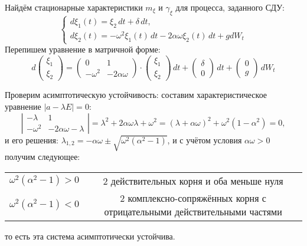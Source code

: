 \begin{ex}
  Найдём стационарные характеристики $m_\xi$ и $\gamma_\xi$ для процесса, заданного СДУ:
  \[
    \begin{cases}
      d\xi_1(t) = \xi_2 \, dt + \delta \, dt, \\
      d\xi_2(t) = - \omega^2 \xi_1(t) \, dt - 2 \alpha \omega \xi_2(t) \, dt + g dW_t
    \end{cases}
  \]
  Перепишем уравнение в матричной форме:
  \[
    d \begin{pmatrix} \xi_1 \\ \xi_2 \end{pmatrix} =
    \begin{pmatrix} 0 & 1 \\ - \omega^2 & - 2 \alpha \omega \end{pmatrix} \cdot
    \begin{pmatrix} \xi_1 \\ \xi_2 \end{pmatrix} \, dt + 
    \begin{pmatrix} \delta \\ 0 \end{pmatrix} \, dt +
    \begin{pmatrix} 0 \\ g \end{pmatrix} \, dW_t
  \]

  Проверим асимптотическую устойчивость: составим характеристическое уравнение
  $|a - \lambda E| = 0$:
  \[
    \left| \begin{matrix} - \lambda & 1 \\ - \omega^2 & - 2 \alpha \omega - \lambda \end{matrix} \right| =
    \lambda^2 + 2\alpha\omega\lambda + \omega^2 =
    (\lambda + \alpha\omega)^2 + \omega^2 (1 - \alpha^2) = 0,
  \]
  и его решения: $\lambda_{1, 2} = - \alpha\omega \pm \sqrt{\omega^2 (\alpha^2 - 1)}$,
  и с учётом условия $\alpha\omega > 0$ получим следующее:
  \begin{center}
    \begin{tabular}{cc}
      $\omega^2 (\alpha^2 - 1) > 0$ & 2 действительных корня и оба меньше нуля \\
      $\omega^2(\alpha^2 - 1) < 0$ & 2 комплексно-сопряжённых корня с отрицательными действительными частями
    \end{tabular}
  \end{center}
  то есть эта система асимптотически устойчива.
  

\end{ex}
